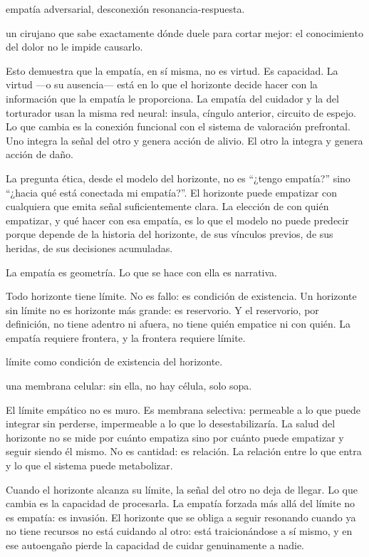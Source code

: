 \begin{fisica}
 empatía adversarial, desconexión resonancia-respuesta.

 un cirujano que sabe exactamente dónde duele para cortar mejor: el conocimiento del dolor no le impide causarlo.
\end{fisica}
Esto demuestra que la empatía, en sí misma, no es virtud. Es capacidad. La virtud —o su ausencia— está en lo que el horizonte decide hacer con la información que la empatía le proporciona. La empatía del cuidador y la del torturador usan la misma red neural: insula, cíngulo anterior, circuito de espejo. Lo que cambia es la conexión funcional con el sistema de valoración prefrontal. Uno integra la señal del otro y genera acción de alivio. El otro la integra y genera acción de daño.

La pregunta ética, desde el modelo del horizonte, no es “¿tengo empatía?” sino “¿hacia qué está conectada mi empatía?”. El horizonte puede empatizar con cualquiera que emita señal suficientemente clara. La elección de con quién empatizar, y qué hacer con esa empatía, es lo que el modelo no puede predecir porque depende de la historia del horizonte, de sus vínculos previos, de sus heridas, de sus decisiones acumuladas.

La empatía es geometría. Lo que se hace con ella es narrativa.

\noindent Todo horizonte tiene límite. No es fallo: es condición de existencia. Un horizonte sin límite no es horizonte más grande: es reservorio. Y el reservorio, por definición, no tiene adentro ni afuera, no tiene quién empatice ni con quién. La empatía requiere frontera, y la frontera requiere límite.

\begin{fisica}
 límite como condición de existencia del horizonte.

 una membrana celular: sin ella, no hay célula, solo sopa.
\end{fisica}
El límite empático no es muro. Es membrana selectiva: permeable a lo que puede integrar sin perderse, impermeable a lo que lo desestabilizaría. La salud del horizonte no se mide por cuánto empatiza sino por cuánto puede empatizar y seguir siendo él mismo. No es cantidad: es relación. La relación entre lo que entra y lo que el sistema puede metabolizar.

Cuando el horizonte alcanza su límite, la señal del otro no deja de llegar. Lo que cambia es la capacidad de procesarla. La empatía forzada más allá del límite no es empatía: es invasión. El horizonte que se obliga a seguir resonando cuando ya no tiene recursos no está cuidando al otro: está traicionándose a sí mismo, y en ese autoengaño pierde la capacidad de cuidar genuinamente a nadie.

